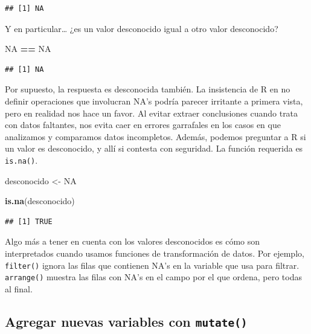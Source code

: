 \documentclass[spanish,]{book}
\newenvironment{Shaded}{\begin{snugshade}}{\end{snugshade}}
\newcommand{\KeywordTok}[1]{\textcolor[rgb]{0.13,0.29,0.53}{\textbf{#1}}}
\newcommand{\NormalTok}[1]{#1}
\newcommand{\OperatorTok}[1]{\textcolor[rgb]{0.81,0.36,0.00}{\textbf{#1}}}
\newcommand{\OtherTok}[1]{\textcolor[rgb]{0.56,0.35,0.01}{#1}}
\newcommand{\StringTok}[1]{\textcolor[rgb]{0.31,0.60,0.02}{#1}}
\begin{document}
\begin{verbatim}
## [1] NA
\end{verbatim}

Y en particular\ldots{} ¿es un valor desconocido igual a otro valor desconocido?

\begin{Shaded}
\begin{Highlighting}[]
\OtherTok{NA} \OperatorTok{==}\StringTok{ }\OtherTok{NA}
\end{Highlighting}
\end{Shaded}

\begin{verbatim}
## [1] NA
\end{verbatim}

Por supuesto, la respuesta es desconocida también. La insistencia de R en no definir operaciones que involucran NA's podría parecer irritante a primera vista, pero en realidad nos hace un favor. Al evitar extraer conclusiones cuando trata con datos faltantes, nos evita caer en errores garrafales en los casos en que analizamos y comparamos datos incompletos. Además, podemos preguntar a R si un valor es desconocido, y allí si contesta con seguridad. La función requerida es \texttt{is.na()}.

\begin{Shaded}
\begin{Highlighting}[]
\NormalTok{desconocido <-}\StringTok{ }\OtherTok{NA}

\KeywordTok{is.na}\NormalTok{(desconocido)}
\end{Highlighting}
\end{Shaded}

\begin{verbatim}
## [1] TRUE
\end{verbatim}

Algo más a tener en cuenta con los valores desconocidos es cómo son interpretados cuando usamos funciones de transformación de datos. Por ejemplo, \texttt{filter()} ignora las filas que contienen NA's en la variable que usa para filtrar. \texttt{arrange()} muestra las filas con NA's en el campo por el que ordena, pero todas al final.

\hypertarget{agregar-nuevas-variables-con-mutate}{%
\subsection{\texorpdfstring{Agregar nuevas variables con \texttt{mutate()}}{Agregar nuevas variables con mutate()}}\label{agregar-nuevas-variables-con-mutate}}
\end{document}
